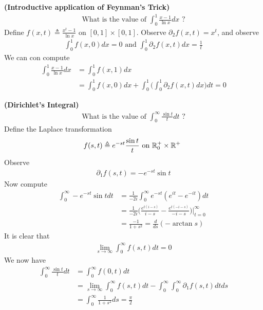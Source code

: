 \documentclass{report}
\begin{document}
\begin{Example}{\textbf{(Introductive application of Feynman's Trick)}}{}
\begin{align*}
  \text{ What is the value of }\int_0^1 \frac{x-1}{\ln x}dx\text{ ? }
\end{align*}
Define $f(x,t)\triangleq \frac{x^t-1}{\ln x}$ on $[0,1]\times [0,1]$. Observe $\partial_2 f(x,t)=x^t$, and observe 
\begin{align*}
\int_0^1 f(x,0)dx=0\text{ and }\int_0^1 \partial_2 f(x,t)dx= \frac{1}{t}
\end{align*}
We can con compute 
\begin{align*}
\int_0^1 \frac{x-1}{\ln x}dx&= \int_0^1 f(x,1)dx\\
&=\int_0^1 f(x,0)dx+\int_0^1 \Big(\int_0^1 \partial_2 f(x,t)dx \Big) dt=0
\end{align*}
\end{Example}
\begin{Example}{\textbf{(Dirichlet's Integral)}}{}
\begin{align*}
\text{ What is the value of }\int_0^{\infty} \frac{\sin t}{t}dt\text{ ? }
\end{align*}
Define the Laplace transformation 
\begin{align*}
f(s,t)\triangleq e^{-st} \frac{\sin t}{t}\text{ on $\mathbb{R}_0^+\times\mathbb{R}^+$ }
\end{align*}
Observe  
\begin{align*}
\partial_1 f(s,t)=-e^{-st}\sin t
\end{align*}
Now compute 
\begin{align*}
  \int_0^{\infty} -e^{-st}\sin tdt &= \frac{1}{-2i}\int_0^{\infty}e^{-st}(e^{it}-e^{-it})dt\\
  &=\frac{1}{-2i} \Big( \frac{e^{t(i-s)}}{i-s}- \frac{e^{t(-i-s)}}{-i-s} \Big) \Big|_{t=0}^{\infty}\\
  &= \frac{-1}{1+s^2}= \frac{d}{ds}(-\arctan s)
\end{align*}
It is clear that 
\begin{align*}
\lim_{s\to \infty} \int_0^{\infty}f(s,t)dt=0
\end{align*}
We now have 
\begin{align*}
\int_0^{\infty}\frac{\sin t}{t}dt&= \int_0^{\infty} f(0,t)dt\\
&=\lim_{s\to \infty}\int_0^{\infty}f(s,t)dt- \int_0^{\infty} \int_0^{\infty} \partial_1 f(s,t)dt ds\\
&=\int_0^{\infty} \frac{1}{1+s^2}ds= \frac{\pi}{2}
\end{align*}
\end{Example}
\end{document}
